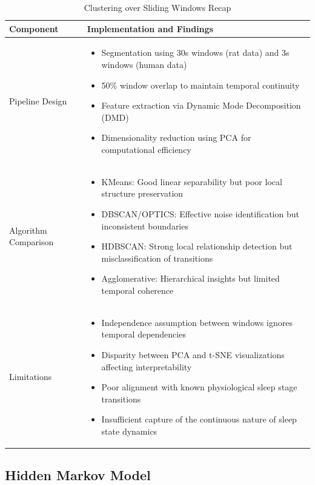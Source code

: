 \documentclass[a4paper,12pt,twoside]{article}
\begin{document}
\begin{table}[H]
\centering
\caption{Clustering over Sliding Windows Recap}
\begin{tabular}{|p{3.5cm}|p{10.5cm}|}
\hline
\textbf{Component} & \textbf{Implementation and Findings} \\
\hline
Pipeline Design & 
\begin{itemize}
  \item Segmentation using 30s windows (rat data) and 3s windows (human data)
  \item 50\% window overlap to maintain temporal continuity
  \item Feature extraction via Dynamic Mode Decomposition (DMD)
  \item Dimensionality reduction using PCA for computational efficiency
\end{itemize} \\
\hline
Algorithm Comparison & 
\begin{itemize}
  \item KMeans: Good linear separability but poor local structure preservation
  \item DBSCAN/OPTICS: Effective noise identification but inconsistent boundaries
  \item HDBSCAN: Strong local relationship detection but misclassification of transitions
  \item Agglomerative: Hierarchical insights but limited temporal coherence
\end{itemize} \\
\hline
Limitations & 
\begin{itemize}
  \item Independence assumption between windows ignores temporal dependencies
  \item Disparity between PCA and t-SNE visualizations affecting interpretability
  \item Poor alignment with known physiological sleep stage transitions
  \item Insufficient capture of the continuous nature of sleep state dynamics
\end{itemize} \\
\hline
\end{tabular}
\label{tab:clustering_summary}
\end{table}



\subsection{Hidden Markov Model}
\end{document}

